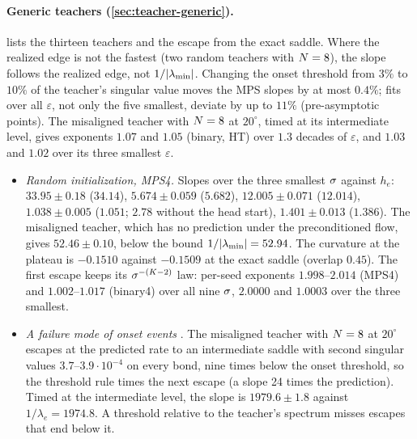 \paragraph{Generic teachers (\cref{sec:teacher-generic}).}
 lists the thirteen teachers and the escape from the exact saddle. Where the realized
edge is not the fastest (two random teachers with $N=8$), the slope follows the realized edge, not
$1/\lvert\lambda_{\min}\rvert$. Changing the onset
threshold from $3\%$ to $10\%$ of the teacher's singular value moves the MPS slopes by at most $0.4\%$; fits
over all $\varepsilon$, not only the five smallest, deviate by up to $11\%$ (pre-asymptotic points). The misaligned
teacher with $N=8$ at $20^\circ$, timed at its intermediate level, gives exponents $1.07$ and $1.05$ (binary,
HT) over $1.3$ decades of $\varepsilon$, and $1.03$ and $1.02$ over its three smallest $\varepsilon$.
\begin{itemize}
  \item \emph{Random initialization, MPS4.} Slopes over the three smallest $\sigma$ against $h_e$: $33.95\pm0.18$
    ($34.14$), $5.674\pm0.059$ ($5.682$), $12.005\pm0.071$ ($12.014$), $1.038\pm0.005$ ($1.051$; $2.78$ without the
    head start), $1.401\pm0.013$ ($1.386$). The misaligned teacher, which has no prediction under the
    preconditioned flow, gives $52.46\pm0.10$, below the bound $1/\lvert\lambda_{\min}\rvert=52.94$. The curvature at the
    plateau is $-0.1510$ against $-0.1509$ at the exact saddle (overlap $0.45$). The first escape keeps its
    $\sigma^{-(K-2)}$ law: per-seed exponents $1.998$--$2.014$ (MPS4) and $1.002$--$1.017$ (binary4) over all nine
    $\sigma$, $2.0000$ and $1.0003$ over the three smallest.
  \item \emph{A failure mode of onset events} \empirical{} \newresult[methodological]. The misaligned teacher
    with $N=8$ at $20^\circ$ escapes at the predicted rate to an intermediate saddle with second singular values
    $3.7$--$3.9\cdot10^{-4}$ on every bond, nine times below the onset threshold, so the threshold rule times the
    next escape (a slope 24 times the prediction). Timed at the intermediate level, the slope is
    $1979.6\pm1.8$ against $1/\lambda_e=1974.8$. A threshold relative to the teacher's spectrum misses escapes that
    end below it.
\end{itemize}

